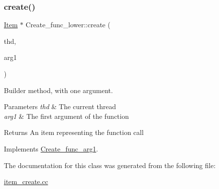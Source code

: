 \subsubsection{\texorpdfstring{create()}{create()}}
{\footnotesize\ttfamily \mbox{\hyperlink{classItem}{Item}} $\ast$ Create\+\_\+func\+\_\+lower\+::create (\begin{DoxyParamCaption}\item[{T\+HD $\ast$}]{thd,  }\item[{\mbox{\hyperlink{classItem}{Item}} $\ast$}]{arg1 }\end{DoxyParamCaption})\hspace{0.3cm}{\ttfamily [virtual]}}

Builder method, with one argument. 
\begin{DoxyParams}{Parameters}
{\em thd} & The current thread \\
\hline
{\em arg1} & The first argument of the function \\
\hline
\end{DoxyParams}
\begin{DoxyReturn}{Returns}
An item representing the function call 
\end{DoxyReturn}


Implements \mbox{\hyperlink{classCreate__func__arg1_a3e9a98f755cd82c3e762e334c955a8c9}{Create\+\_\+func\+\_\+arg1}}.



The documentation for this class was generated from the following file\+:\begin{DoxyCompactItemize}
\item 
\mbox{\hyperlink{item__create_8cc}{item\+\_\+create.\+cc}}\end{DoxyCompactItemize}
